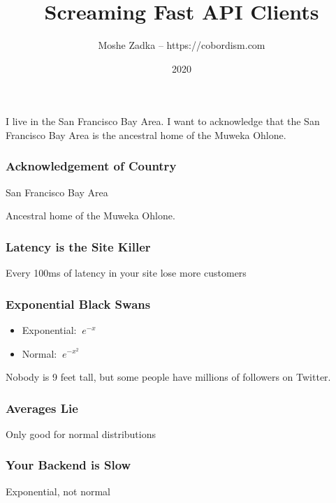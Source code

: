 \usepackage{hyperref}
\usepackage{graphicx}
\usepackage{listings}
\usepackage{textcomp}
\usepackage{fancyvrb}

\title{Screaming Fast API Clients}
\author{Moshe Zadka -- https://cobordism.com}
\date{2020}


\begin{titlepage}
\maketitle
\end{titlepage}

\frame{\titlepage}

I live in the San Francisco Bay Area.
I want to acknowledge that the San Francisco Bay Area
is the ancestral home of the Muweka Ohlone.

\begin{frame}
\frametitle{Acknowledgement of Country}

San Francisco Bay Area

Ancestral home of the Muweka Ohlone.

\end{frame}

\begin{frame}
\frametitle{Latency is the Site Killer}

Every 100ms of latency in your site lose more customers

\end{frame}

\begin{frame}
\frametitle{Exponential Black Swans}

\begin{itemize}
\item Exponential: $~e^{-x}$
\item Normal: $~e^{-x^2}$
\end{itemize}

\end{frame}

Nobody is 9 feet tall,
but some people have millions of followers on Twitter.

\begin{frame}
\frametitle{Averages Lie}

Only good for normal distributions

\end{frame}

\begin{frame}
\frametitle{Your Backend is Slow}

Exponential, not normal

\end{frame}

